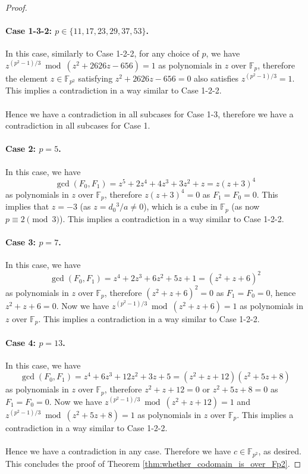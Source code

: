 \documentclass[10pt,a4paper]{amsart}
\newcommand{\FF}{\mathbb{F}}
\begin{document}
\begin{proof}
\paragraph{Case 1-3-2: $p \in \{11,17,23,29,37,53\}$.}

In this case, similarly to Case 1-2-2, for any choice of $p$, we have $z^{(p^2 - 1) / 3} \bmod (z^2 + 2626 z - 656) = 1$ as polynomials in $z$ over $\FF_p$, therefore the element $z \in \FF_{p^2}$ satisfying $z^2 + 2626 z - 656 = 0$ also satisfies $z^{(p^2 - 1) / 3} = 1$.
This implies a contradiction in a way similar to Case 1-2-2.

\paragraph{}

Hence we have a contradiction in all subcases for Case 1-3, therefore we have a contradiction in all subcases for Case 1.

\paragraph{Case 2: $p = 5$.}

In this case, we have
\[
\gcd(F_0,F_1)
= z^5 + 2 z^4 + 4 z^3 + 3 z^2 + z
= z (z + 3)^4
\]
as polynomials in $z$ over $\FF_p$, therefore $z (z + 3)^4 = 0$ as $F_1 = F_0 = 0$.
This implies that $z = -3$ (as $z = d_0{}^3 / a \neq 0$), which is a cube in $\FF_p$ (as now $p \equiv 2 \pmod{3}$).
This implies a contradiction in a way similar to Case 1-2-2.

\paragraph{Case 3: $p = 7$.}

In this case, we have
\[
\gcd(F_0,F_1)
= z^4 + 2 z^3 + 6 z^2 + 5 z + 1
= (z^2 + z + 6)^2
\]
as polynomials in $z$ over $\FF_p$, therefore $(z^2 + z + 6)^2 = 0$ as $F_1 = F_0 = 0$, hence $z^2 + z + 6 = 0$.
Now we have $z^{(p^2 - 1) / 3} \bmod (z^2 + z + 6) = 1$ as polynomials in $z$ over $\FF_p$.
This implies a contradiction in a way similar to Case 1-2-2.

\paragraph{Case 4: $p = 13$.}

In this case, we have
\[
\gcd(F_0,F_1)
= z^4 + 6 z^3 + 12 z^2 + 3 z + 5
= (z^2 + z + 12) (z^2 + 5 z + 8)
\]
as polynomials in $z$ over $\FF_p$, therefore $z^2 + z + 12 = 0$ or $z^2 + 5 z + 8 = 0$ as $F_1 = F_0 = 0$.
Now we have $z^{(p^2 - 1) / 3} \bmod (z^2 + z + 12) = 1$ and $z^{(p^2 - 1) / 3} \bmod (z^2 + 5 z + 8) = 1$ as polynomials in $z$ over $\FF_p$.
This implies a contradiction in a way similar to Case 1-2-2.

\paragraph{}

Hence we have a contradiction in any case.
Therefore we have $c \in \FF_{p^2}$, as desired.
This concludes the proof of Theorem \ref{thm:whether_codomain_is_over_Fp2}.
\end{proof}
\end{document}
